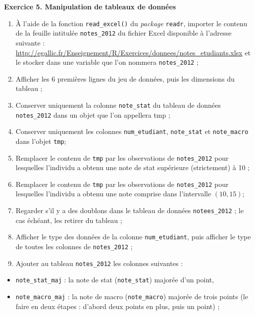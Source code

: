 \documentclass[
  11pt,
]{book}
\makeatletter
\providecommand{\tightlist}{%
  \setlength{\itemsep}{0pt}\setlength{\parskip}{0pt}}
\numberwithin{equation}{section}
\numberwithin{countremarque}{section}
\newenvironment{exframe}{%
 \def\at@end@of@exframe{}%
 \ifinner\ifhmode%
  \def\at@end@of@exframe{\end{minipage}}%
  \begin{minipage}{\columnwidth}%
 \fi\fi%
 \def\FrameCommand##1{\hskip\@totalleftmargin \hskip-\fboxsep
 \colorbox{shadecolorex}{##1}\hskip-\fboxsep
     \hskip-\linewidth \hskip-\@totalleftmargin \hskip\columnwidth}%
 \MakeFramed {\advance\hsize-\width
   \@totalleftmargin\z@ \linewidth\hsize
   \@setminipage}}%
 {\par\unskip\endMakeFramed%
 \at@end@of@exframe}
\makeatother
\begin{document}
\begin{exframe}
\textbf{Exercice 5. Manipulation de tableaux de données}

\begin{enumerate}
\def\labelenumi{\arabic{enumi}.}
\tightlist
\item
  À l'aide de la fonction \texttt{read\_excel()} du \emph{package} \texttt{readr}, importer le contenu de la feuille intitulée \texttt{notes\_2012} du fichier Excel disponible à l'adresse suivante : \url{http://egallic.fr/Enseignement/R/Exercices/donnees/notes_etudiants.xlsx} et le stocker dans une variable que l'on nommera \texttt{notes\_2012} ;
\item
  Afficher les 6 premières lignes du jeu de données, puis les dimensions du tableau ;
\item
  Conserver uniquement la colonne \texttt{note\_stat} du tableau de données \texttt{notes\_2012} dans un objet que l'on appellera tmp ;
\item
  Conserver uniquement les colonnes \texttt{num\_etudiant}, \texttt{note\_stat} et \texttt{note\_macro} dans l'objet \texttt{tmp};
\item
  Remplacer le contenu de \texttt{tmp} par les observations de \texttt{notes\_2012} pour lesquelles l'individu a obtenu une note de stat supérieure (strictement) à 10 ;
\item
  Remplacer le contenu de \texttt{tmp} par les observations de \texttt{notes\_2012} pour lesquelles l'individu a obtenu une note comprise dans l'intervalle \((10,15)\);
\item
  Regarder s'il y a des doublons dans le tableau de données \texttt{notees\_2012} ; le cas échéant, les retirer du tableau ;
\item
  Afficher le type des données de la colonne \texttt{num\_etudiant}, puis afficher le type de toutes les colonnes de \texttt{notes\_2012} ;
\item
  Ajouter au tableau \texttt{notes\_2012} les colonnes suivantes :
\end{enumerate}

\begin{itemize}
\tightlist
\item
  \texttt{note\_stat\_maj} : la note de stat (\texttt{note\_stat}) majorée d'un point,
\item
  \texttt{note\_macro\_maj} : la note de macro (\texttt{note\_macro}) majorée de trois points (le faire en deux étapes : d'abord deux points en plus, puis un point) ;
\end{itemize}


\end{exframe}
\end{document}
